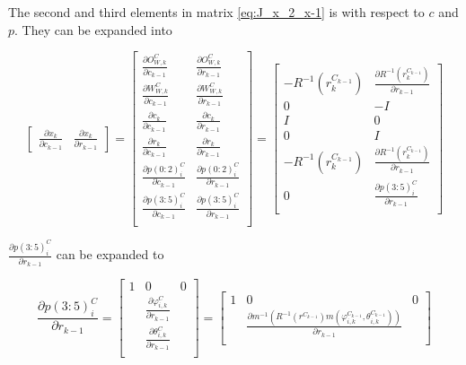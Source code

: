 The second and third elements in matrix \ref{eq:J_x_2_x-1} is with
respect to $c$ and $p$. They can be expanded into

$$
\begin{bmatrix}\frac{\partial x_{k}}{\partial c_{k-1}} & 
\frac{\partial x_{k}}{\partial r_{k-1}} \end{bmatrix} =
\begin{bmatrix}
\frac{\partial O_{W,k}^{C}}{\partial c_{k-1}} & 
\frac{\partial O_{W,k}^{C}}{\partial r_{k-1}} \\
\frac{\partial W_{W,k}^{C}}{\partial c_{k-1}} & 
\frac{\partial W_{W,k}^{C}}{\partial r_{k-1}} \\
\frac{\partial c_{k}}{\partial c_{k-1}} & 
\frac{\partial c_{k}}{\partial r_{k-1}} \\
\frac{\partial r_{k}}{\partial c_{k-1}} & 
\frac{\partial r_{k}}{\partial r_{k-1}} \\
\frac{\partial p(0:2)_{i}^{C}}{\partial c_{k-1}} & 
\frac{\partial p(0:2)_{i}^{C}}{\partial r_{k-1}} \\
\frac{\partial p(3:5)_{i}^{C}}{\partial c_{k-1}} & 
\frac{\partial p(3:5)_{i}^{C}}{\partial r_{k-1}} \\
\end{bmatrix} = \begin{bmatrix}
-R^{-1}(r_{k}^{C_{k-1}}) & 
\frac{\partial R^{-1}(r_{k}^{C_{k-1}})}{\partial r_{k-1}} \\
0 & -I \\
I & 0 \\
0 & I \\
-R^{-1}(r_{k}^{C_{k-1}}) & 
\frac{\partial R^{-1}(r_{k}^{C_{k-1}})}{\partial r_{k-1}}\\
0 & \frac{\partial p(3:5)_{i}^{C}}{\partial r_{k-1}} \\
\end{bmatrix}
$$

\noincent $\frac{\partial p(3:5)_{i}^{C}}{\partial r_{k-1}}$ can be
expanded to

$$
\frac{\partial p(3:5)_{i}^{C}}{\partial r_{k-1}}=\begin{bmatrix}
1 & 0 & 0\\
 & \frac{\partial \varphi _{i, k}^{C}}{\partial r_{k-1}} & \\
 & \frac{\partial \theta _{i, k}^{C}}{\partial r_{k-1}} \\
\end{bmatrix} = \begin{bmatrix}
1 & 0 & 0 \\
 & \frac{\partial m^{-1}(R^{-1}(r^{C_{k-1}})
m(\varphi _{i, k}^{C_{k-1}}, \theta _{i, k}^{C_{k-1}}))}
{\partial r_{k-1}} & \\
\end{bmatrix}
$$

